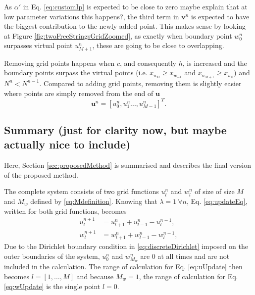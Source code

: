 \documentclass[dvipsnames, reprint]{JASA}
\def\SWcomment[#1]{\textcolor{Bittersweet}{#1}}
\begin{document}
As $\alpha'$ in Eq. \eqref{eq:customIp} is expected to be close to zero \SWcomment[maybe explain that at low parameter variations this happens?], the third term in $\mathbf{v}^n$ is expected to have the biggest contribution to the newly added point. This makes sense by looking at Figure \ref{fig:twoFreeStringsGridZoomed}, as exactly when boundary point $w_0^n$ surpasses virtual point $u_{M+1}^n$, these are going to be close to overlapping.

Removing grid points happens when $c$, and consequently $h$, is increased and the boundary points surpass the virtual points (i.e. $x_{u_M} \geq x_{w_{-1}}$ and $x_{u_{M+1}} \geq x_{w_0}$) and $N^n < N^{n-1}$. Compared to adding grid points, removing them is slightly easier where points are simply removed from the end of $\mathbf{u}$
\begin{equation}\label{eq:removingPoint}
    \mathbf{u}^n = [u_0^n, u_1^n ..., u_{M-1}^n]^T. 
\end{equation}

\subsection{Summary \SWcomment[(just for clarity now, but maybe actually nice to include)]}
Here, Section \ref{sec:proposedMethod} is summarised and describes the final version of the proposed method.

The complete system consists of two grid functions $u_l^n$ and $w_l^n$ of size of size $M$ and $M_w$ defined by \eqref{eq:Mdefinition}. Knowing that $\lambda=1\ \forall n$, Eq. \eqref{eq:updateEq}, written for both grid functions, becomes 
\begin{align}
    u_l^{n+1} &= u_{l+1}^n + u_{l-1}^n - u_l^{n-1},\label{eq:uUpdate}\\
    w_l^{n+1} &= w_{l+1}^n + w_{l-1}^n - w_l^{n-1}\label{eq:wUpdate},
\end{align}
Due to the Dirichlet boundary condition in \eqref{eq:discreteDirichlet} imposed on the outer boundaries of the system, $u_0^n$ and $w_{M_w}^n$ are $0$ at all times and are not included in the calculation. The range of calculation for Eq. \eqref{eq:uUpdate} then becomes $l = [1, \hdots, M]$ and because $M_w = 1$, the range of calculation for Eq. \eqref{eq:wUpdate} is the single point $l = 0$. 
\end{document}
